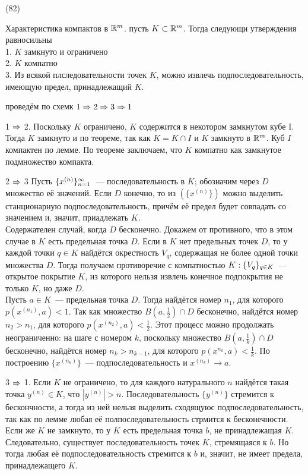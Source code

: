 (82)

\T \q Характеристика компактов в $\mathbb{R}^m$. пусть $K\subset \mathbb{R}^m$. Тогда следующи утверждения равносильны\\
1. $K$ замкнуто и ограничено\\
2. $K$ компатно\\
3. Из всякой плследовательности точек $K$, можно извлечь подпоследовательность, имеющую предел, принадлежащий $K$.

\D проведём по схемк $1 \Rightarrow 2 \Rightarrow 3 \Rightarrow 1$

1 $\Rightarrow$ 2. Поскольку $K$ ограничено, $K$ содержится в некотором замкнутом кубе I. Тогда $K$ замкнуто и по теореме, так как $K = K \cap I$ и $K$ замкнуто в $\mathbb{R}^m$. Куб $I$ компактен по лемме. По теореме заключаем, что $K$ компатно как замкнутое подмножество компакта.

2 $\Rightarrow$ 3 Пусть $\{x^{(n)}\}^{\infty}_{n = 1}$~--- последовательность в $K$; обозначим через $D$ множество её значений. Если $D$ конечно, то из $(\{x^{(n)}\})$ можно выделить станционарную подпоследовательность, причём её предел будет совпадать со значением и, значит, приадлежать $K$.\\
Содержателен случай, когда $D$ бесконечно. Докажем от противного, что в этом случае в $K$ есть предельная точка $D$. Если в $K$ нет предельных точек $D$, то у каждой точки $q \in K$ найдётся окрестность $V_q$, содержащая не более одной точки множества $D$. Тогда получаем противоречие с компатностью $K: \{V_{q}\}_{q \in K}$~--- открытое покрытие $K$, из которого нельзя извлечь конечное подпокрытия не только $K$, но даже $D$.\\
Пусть $a \in K$~--- предельная точка $D$. Тогда найдётся номер $n_1$, для которого $p(x^{(n_1)}, a) < 1$. Так как множество $B(a, \frac{1}{2}) \cap D$ бесконечно, найдётся номер $n_2 > n_1$, для которого $p(x^{(n_2)}, a) < \frac{1}{2}$. Этот процесс можно продолжать неограниченно: на шаге с номером $k$, поскольку множество $B(a, \frac{1}{k})\cap D$ бесконечно, найдётся номер $n_k > n_{k - 1}$, для которого $p(x^{n_k}, a) < \frac{1}{k}$. По построению $\{x^{(n_k)}\}$~--- подпоследовательность и $x^{(n_k)}\to a$.

3 $\Rightarrow$ 1. Если $K$ не ограничено, то для каждого натурального $n$ найдётся такая точка $y^{(n)} \in K$, что $|y^{(n)}| > n$. Последовательность $\{y^{(n)}\}$ стремится к бескончности, а тогда из ней нельзя выделить сходящуюс подпоследовательность, так как по лемме любая её полпоследовательность стрмится к бесконечности.\\
Если же $K$ не замкнуто, то у $K$ есть предельная точка $b$, не принадлежащая $K$. Следовательно, существует последовательность точек  $K$, стремящаяся к $b$. Но тогда любая её подпоследовательность стремится к $b$ и, значит, не имеет предела, принадлежащего $K$.

